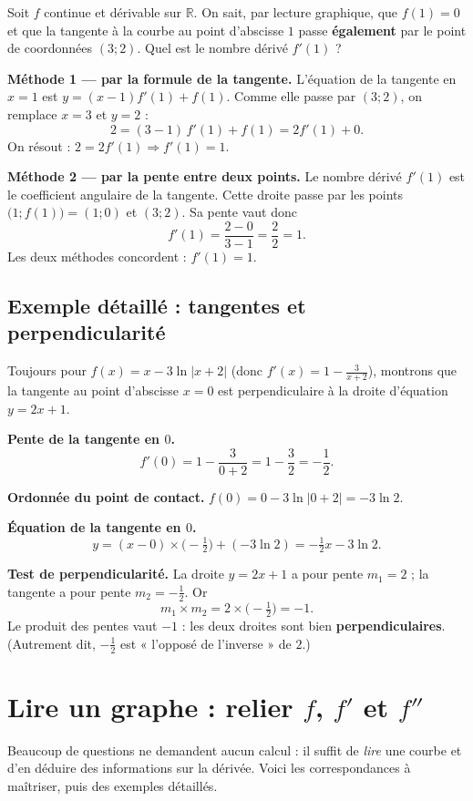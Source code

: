\documentclass[11pt,a4paper]{article}
\newcommand{\R}{\mathbb{R}}
\begin{document}
\begin{exemple}[La tangente en $x=1$ passe par $(3;2)$, avec $f(1)=0$]
Soit $f$ continue et dérivable sur $\R$. On sait, par lecture graphique, que $f(1)=0$ et que la
tangente à la courbe au point d'abscisse $1$ passe \textbf{également} par le point de coordonnées
$(3;2)$. Quel est le nombre dérivé $f'(1)$ ?

\medskip
\textbf{Méthode 1 — par la formule de la tangente.} L'équation de la tangente en $x=1$ est
$y=(x-1)f'(1)+f(1)$. Comme elle passe par $(3;2)$, on remplace $x=3$ et $y=2$ :
\[
   2=(3-1)\,f'(1)+f(1)=2f'(1)+0.
\]
On résout : $2=2f'(1)\Rightarrow f'(1)=1$.

\medskip
\textbf{Méthode 2 — par la pente entre deux points.} Le nombre dérivé $f'(1)$ est le coefficient
angulaire de la tangente. Cette droite passe par les points $\big(1;f(1)\big)=(1;0)$ et $(3;2)$.
Sa pente vaut donc
\[
   f'(1)=\frac{2-0}{3-1}=\frac{2}{2}=1.
\]
Les deux méthodes concordent : $\boxed{f'(1)=1}$.
\end{exemple}

\subsection{Exemple détaillé : tangentes et perpendicularité}

\begin{exemple}
Toujours pour $f(x)=x-3\ln|x+2|$ (donc $f'(x)=1-\tfrac{3}{x+2}$), montrons que la tangente au point
d'abscisse $x=0$ est perpendiculaire à la droite d'équation $y=2x+1$.

\medskip
\textbf{Pente de la tangente en $0$.}
\[
   f'(0)=1-\frac{3}{0+2}=1-\frac{3}{2}=-\frac{1}{2}.
\]

\textbf{Ordonnée du point de contact.} $f(0)=0-3\ln|0+2|=-3\ln 2$.

\textbf{Équation de la tangente en $0$.}
\[
   y=(x-0)\times\Big(-\tfrac12\Big)+(-3\ln 2)=-\tfrac12 x-3\ln 2.
\]

\textbf{Test de perpendicularité.} La droite $y=2x+1$ a pour pente $m_1=2$ ; la tangente a pour pente
$m_2=-\tfrac12$. Or
\[
   m_1\times m_2=2\times\Big(-\tfrac12\Big)=-1.
\]
Le produit des pentes vaut $-1$ : les deux droites sont bien \textbf{perpendiculaires}. (Autrement dit,
$-\tfrac12$ est « l'opposé de l'inverse » de $2$.)
\end{exemple}

\section{Lire un graphe : relier \texorpdfstring{$f$}{f}, \texorpdfstring{$f'$}{f'} et \texorpdfstring{$f''$}{f''}}
\label{sec:lecture}
Beaucoup de questions ne demandent aucun calcul : il suffit de \emph{lire} une courbe et d'en déduire
des informations sur la dérivée. Voici les correspondances à maîtriser, puis des exemples détaillés.
\end{document}
